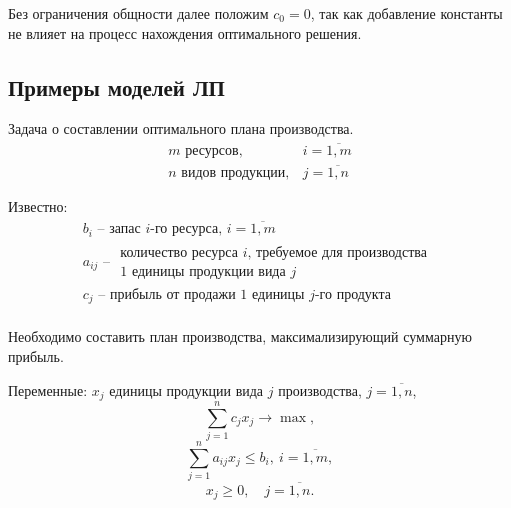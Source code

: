 \begin{remark}
    Без ограничения общности далее положим $ c_0 = 0 $, так как добавление константы не влияет на процесс нахождения оптимального решения.
\end{remark}

\subsection{Примеры моделей ЛП}

\begin{example}
    Задача о составлении оптимального плана производства.
    \[
        \begin{array}{ll}
            m \text{ ресурсов},        & i = \overline{1,m} \\
            n \text{ видов продукции}, & j = \overline{1,n}
        \end{array}
    \]

    Известно:
    \[
        \begin{array}{l}
            b_i \text{ -- запас }i\text{-го ресурса, }i = \overline{1,m}                      \\
            a_{ij} \text{ -- }\begin{array}{l}
                                  \text{количество ресурса }i\text{, требуемое для производства } \\
                                  1\text{ единицы продукции вида }j
                              \end{array} \\
            c_j \text{ -- прибыль от продажи }1\text{ единицы }j\text{-го продукта}           \\
        \end{array}
    \]

    Необходимо составить план производства, максимализирующий суммарную прибыль.

    Переменные: $ x_j $ единицы продукции вида $ j $ производства, $ j = \overline{1,n} $,
    \[
        \sum_{j=1}^{n}c_jx_j \longrightarrow \max,
    \]
    \[
        \sum_{j=1}^{n}a_{ij}x_j \leqslant b_i, \ i = \overline{1,m},
    \]
    \[
        x_j \geqslant 0, \quad j = \overline{1,n}.
    \]
\end{example}

